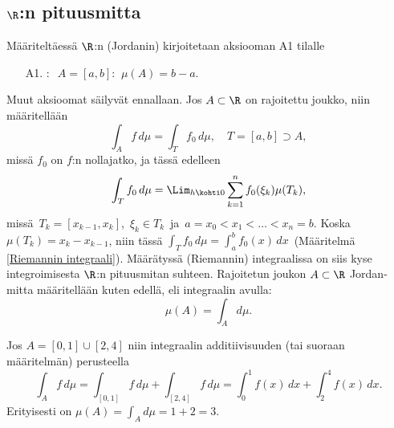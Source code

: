 \subsection*{$\R$:n pituusmitta}

Määriteltäessä $\R$:n (Jordanin)  kirjoitetaan aksiooman A1 tilalle
\begin{itemize}
\item[A1.] : $\,\ A=[a,b]: \,\ \mu(A)=b-a$.
\end{itemize}
Muut aksioomat säilyvät ennallaan. Jos $A\subset\R$ on rajoitettu joukko, niin määritellään
\[
\int_A f\,d\mu = \int_T f_0\,d\mu, \quad T=[a,b] \supset A,
\]
missä $f_0$ on $f$:n nollajatko, ja tässä edelleen
\[
\int_T f_0\,d\mu = \Lim_{h \kohti 0} \sum_{k=1}^n f_0(\xi_k)\mu(T_k),
\]
missä $\,T_k=[x_{k-1},x_k]$, $\,\xi_k \in T_k\,$ ja $\,a=x_0<x_1 < \ldots <x_n=b$. Koska
$\mu(T_k)=x_k-x_{k-1}$, niin tässä $\int_T f_0\,d\mu=\int_a^b f_0(x)\,dx\,$ (Määritelmä
\ref{Riemannin integraali}). Määrätyssä (Riemannin) integraalissa on siis kyse integroimisesta
$\R$:n pituusmitan suhteen. Rajoitetun joukon $A\subset\R$ Jordan-mitta määritellään kuten
edellä, eli integraalin avulla:
\[
\mu(A)=\int_A d\mu.
\]
\begin{Exa} Jos $A=[0,1]\cup[2,4]$ niin integraalin additiivisuuden (tai suoraan määritelmän)
perusteella
\[
\int_A f\,d\mu = \int_{[0,1]} f\,d\mu+\int_{[2,4]} f\,d\mu 
               = \int_0^1 f(x)\,dx+\int_2^4 f(x)\,dx.
\]
Erityisesti on $\mu(A)=\int_A d\mu = 1+2=3$. \loppu
\end{Exa}

